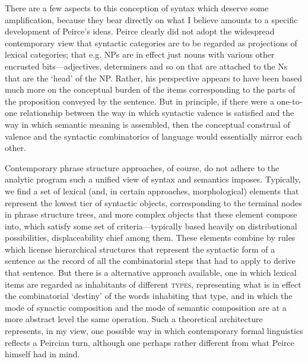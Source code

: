 \documentclass[output=paper,colorlinks,citecolor=brown]{langscibook}
\begin{document}
There are a few aspects to this conception of syntax which deserve
some amplification, because they bear directly on what I believe
amounts to a specific development of Peirce's ideas. Peirce clearly
did not adopt the widespread contemporary view that syntactic
categories are to be regarded as projections of lexical categories;
that e.g. NPs are in effect just nouns with various other encrusted
bits---adjectives, determiners and so on that are attached to the Ns
that are the `head' of the NP. Rather, his perspective appears to have been
based much more on the conceptual burden of the items corresponding to
the parts of the proposition conveyed by the sentence. But in
principle, if there were a one-to-one relationship between the way in
which syntactic valence is satisfied and the way in which semantic
meaning is assembled, then the conceptual construal of valence and the
syntactic combinatorics of language would essentially mirror each
other.

Contemporary phrase structure approaches, of course, do not adhere to
the analytic program such a unified view of syntax and semantics
imposes. Typically, we find a set of lexical (and, in certain
approaches, morphological) elements that represent the lowest tier of
syntactic objects, corresponding to the terminal nodes in phrase
structure trees, and more complex objects that these element compose
into, which satisfy some set of criteria---typically based heavily on
distributional possibilities, displaceability chief among them. These
elements combine by rules which license hierarchical structures that
represent the syntactic form of a sentence as the record of all the
combinatorial steps that had to apply to derive that sentence.  But
there is a alternative approach available, one in which lexical items
are regarded as inhabitants of different \textsc{types}, representing what
is in effect the combinatorial `destiny' of the words inhabiting that
type, and in which the mode of synactic composition and the mode of
semantic composition are at a more abstract level the same
operation. Such a theoretical architecture represents, in my view, one
possible way in which contemporary formal linguistics reflects a
Peircian turn, although one perhaps rather different from what Peirce
himself had in mind.
\end{document}
